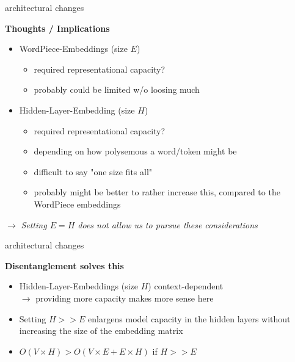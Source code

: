 \documentclass[11pt,compress,t,notes=noshow, xcolor=table]{beamer}
\begin{document}
\begin{frame}{architectural changes}

\vfill

\textbf{Thoughts / Implications}

	\begin{itemize}
		\item	WordPiece-Embeddings (size $E$) 
			\begin{itemize}
				\item required representational capacity?
				\item probably could be limited w/o loosing much
			\end{itemize}
		\item Hidden-Layer-Embedding (size $H$)
			\begin{itemize}
				\item required representational capacity?
				\item depending on how polysemous a word/token might be
				\item difficult to say "one size fits all"
				\item probably might be better to rather increase this, compared to the WordPiece embeddings
			\end{itemize}
	\end{itemize}
	
\vspace{.5cm}

$\to$ \textit{Setting $E = H$ does not allow us to pursue these considerations}

\vfill

\end{frame}


\begin{frame}{architectural changes}

\vfill

\textbf{Disentanglement solves this}

	\begin{itemize}
		\item Hidden-Layer-Embeddings (size $H$) context-dependent\\
					$\to$ providing more capacity makes more sense here
		\item Setting $H >> E$ enlargens model capacity in the hidden layers without increasing the size of the embedding matrix
		\item $O(V \times H) > O(V \times E +  E \times H)$ if $H >> E$
\end{itemize}

\vfill

\end{frame}
\end{document}
